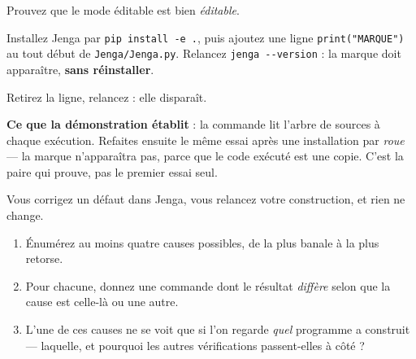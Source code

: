 \begin{nkdemo}
Prouvez que le mode éditable est bien \emph{éditable}.

Installez Jenga par \texttt{pip install -e .}, puis ajoutez une ligne
\texttt{print("MARQUE")} au tout début de \texttt{Jenga/Jenga.py}. Relancez
\texttt{jenga -{}-version} : la marque doit apparaître, \textbf{sans réinstaller}.

Retirez la ligne, relancez : elle disparaît.

\textbf{Ce que la démonstration établit} : la commande lit l'arbre de sources à
chaque exécution. Refaites ensuite le même essai après une installation par
\emph{roue} --- la marque n'apparaîtra pas, parce que le code exécuté est une
copie. C'est la paire qui prouve, pas le premier essai seul.
\end{nkdemo}

\begin{nklogique}
Vous corrigez un défaut dans Jenga, vous relancez votre construction, et rien ne
change.

\begin{enumerate}
\item Énumérez au moins quatre causes possibles, de la plus banale à la plus
      retorse.
\item Pour chacune, donnez une commande dont le résultat \emph{diffère} selon
      que la cause est celle-là ou une autre.
\item L'une de ces causes ne se voit que si l'on regarde \emph{quel} programme a
      construit --- laquelle, et pourquoi les autres vérifications passent-elles
      à côté ?
\end{enumerate}
\end{nklogique}
